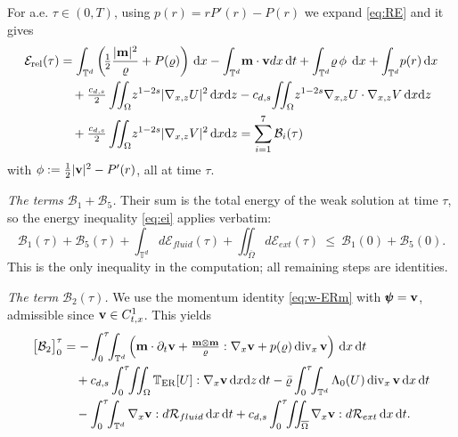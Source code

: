 \documentclass[12pt,a4paper,twoside]{article}
\newcommand{\vr}{\varrho}
\newcommand{\vv}{\vc{v}}
\newcommand{\vc}[1]{{\bf #1}}
\newcommand{\dx}{{\,\rm d} {x}}
\newcommand{\dt}{{\,\rm d} t }
\newcommand{\lr}[1]{\left( #1 \right)}
\newcommand{\Erel}{\mathcal{E}_{\mathrm{rel}}}
\numberwithin{equation}{section}%
\newcommand{\T}{\mathbb{T}}
\newcommand{\vm}{\vc{m}}
\newcommand{\dz}{{\rm d} z}
\newcommand{\Gradx}{\nabla_x}
\newcommand{\Gradxz}{\nabla_{x,z}}
\newcommand{\Divx}{\operatorname{div}_x}
\newcommand{\Lambdaz}{\Lambda_0}
\begin{document}
	\begin{pf}
		For a.e. $\tau \in (0,T)$, using $p(r)=rP'(r)-P(r)$ we expand \eqref{eq:RE} and it gives
		\begin{align*}
					\Erel(\tau)
				&=\int_{\mathbb T^d}\lr{\!\tfrac12 \frac{|\vm|^2}{\vr} +P(\vr)} \dx 
				-\int_{\mathbb T^d}\!\mathbf m\cdot\vv dx \dt 
				+\int_{\mathbb T^d}\!\vr\,\phi\;  \dx 
				+\int_{\mathbb T^d}\!p(r)\dx  \\
				&	\quad	+\tfrac{c_{d,s}}2\iint_\Omega\! z^{1-2s}|\Gradxz U|^2 \dx \dz 
				-c_{d,s}\!\iint_\Omega\! z^{1-2s}\Gradxz U\cdot\Gradxz V \dx \dz \\
				&\quad
				+\tfrac{c_{d,s}}2\iint_\Omega\! z^{1-2s}|\Gradxz V|^2 \dx \dz=\sum_{i=1}^{7} \mathcal{B}_i (\tau)
		\end{align*}
		with $\phi:=\tfrac12|\vv|^2-P'(r)$, all at time $\tau$.

		
		\smallskip
		\noindent\emph{The terms $\mathcal B_1+\mathcal B_5$.} Their sum is the total energy of the weak solution at time $\tau$, so the energy inequality \eqref{eq:ei} applies verbatim:
		\begin{equation}\label{B15}
			\mathcal B_1(\tau)+\mathcal B_5(\tau)+\int_{\mathbb T^d}d\mathcal E_{fluid}(\tau)+\iint_{\overline\Omega}d\mathcal E_{ext}(\tau)
			\ \le\ \mathcal B_1(0)+\mathcal B_5(0).
		\end{equation}
		This is the only inequality in the computation; all remaining steps are identities.

		\noindent\emph{The term $\mathcal B_2(\tau)$.} We use the momentum identity \eqref{eq:w-ERm} with $\pmb\psi=\vv$, admissible since $\vv\in C^1_{t,x}$.  This yields
		\begin{equation}\label{B2}
			\begin{aligned}
				\big[\mathcal B_2\big]_0^\tau
				&=-\int_0^\tau\!\!\int_{\mathbb T^d}\lr{\vm\cdot\partial_t\vv+\tfrac{\vm\otimes\vm}{\vr}:\Gradx\vv+p(\vr)\Divx\vv}\dx\dt\\
				&\quad+c_{d,s}\int_0^\tau\!\!\iint_\Omega\T_{\rm ER}[U]:\Gradx\vv \dx\dz\dt
				-\bar\vr\int_0^\tau\!\!\int_{\mathbb T^d}\Lambdaz(U)\Divx\vv \dx\dt\\
				&\quad-\int_0^\tau\!\!\int_{\mathbb T^d}\Gradx\vv:d\mathcal R_{fluid} \dx\dt
				+c_{d,s}\int_0^\tau\!\!\iint_{\overline\Omega}\Gradx\vv:d\mathcal R_{ext} \dx\dt .
			\end{aligned}
		\end{equation}


\end{pf}
\end{document}
